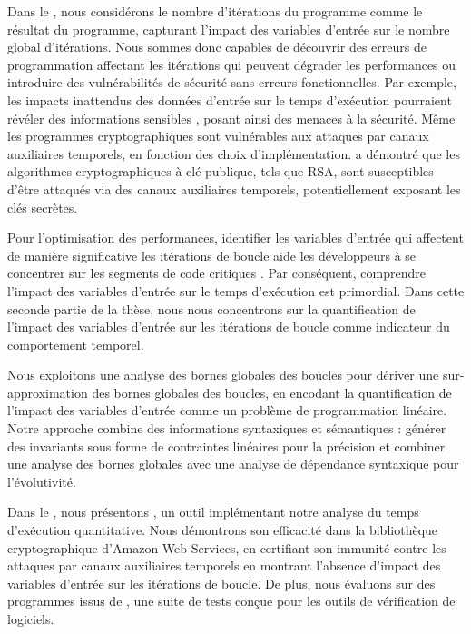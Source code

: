 {Dans le , nous considérons le nombre d'itérations du programme comme le résultat du programme, capturant l'impact des variables d'entrée sur le nombre global d'itérations. Nous sommes donc capables de découvrir des erreurs de programmation affectant les itérations qui peuvent dégrader les performances ou introduire des vulnérabilités de sécurité sans erreurs fonctionnelles. Par exemple, les impacts inattendus des données d'entrée sur le temps d'exécution pourraient révéler des informations sensibles , posant ainsi des menaces à la sécurité. Même les programmes cryptographiques sont vulnérables aux attaques par canaux auxiliaires temporels, en fonction des choix d'implémentation.  a démontré que les algorithmes cryptographiques à clé publique, tels que RSA, sont susceptibles d'être attaqués via des canaux auxiliaires temporels, potentiellement exposant les clés secrètes.

Pour l'optimisation des performances, identifier les variables d'entrée qui affectent de manière significative les itérations de boucle aide les développeurs à se concentrer sur les segments de code critiques . Par conséquent, comprendre l'impact des variables d'entrée sur le temps d'exécution est primordial. Dans cette seconde partie de la thèse, nous nous concentrons sur la quantification de l'impact des variables d'entrée sur les itérations de boucle comme indicateur du comportement temporel.

Nous exploitons une analyse des bornes globales des boucles pour dériver une sur-approximation des bornes globales des boucles, en encodant la quantification de l'impact des variables d'entrée comme un problème de programmation linéaire. Notre approche combine des informations syntaxiques et sémantiques : générer des invariants sous forme de contraintes linéaires pour la précision et combiner une analyse des bornes globales avec une analyse de dépendance syntaxique  pour l'évolutivité.

Dans le , nous présentons \timesec\sidenote{\timesecurl}, un outil implémentant notre analyse du temps d'exécution quantitative. Nous démontrons son efficacité dans la bibliothèque cryptographique \bignum{} d'Amazon Web Services\sidenote{\bignumurl}, en certifiant son immunité contre les attaques par canaux auxiliaires temporels en montrant l'absence d'impact des variables d'entrée sur les itérations de boucle. De plus, nous évaluons \timesec{} sur des programmes issus de \svcomp\sidenote{\svcompurl}, une suite de tests conçue pour les outils de vérification de logiciels.

}
